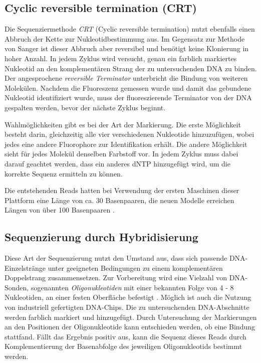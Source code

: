 \subsection{Cyclic reversible termination (CRT)}
\label{sec:bio:seq:crt}

Die Sequenziermethode \emph{CRT} (Cyclic reversible termination) nutzt ebenfalls einen Abbruch der Kette zur Nukleotidbestimmung aus. Im Gegensatz zur Methode von Sanger ist dieser Abbruch aber reversibel und benötigt keine Klonierung in hoher Anzahl. In jedem Zyklus wird versucht, genau ein farblich markiertes Nukleotid an den komplementären Strang der zu untersuchenden DNA zu binden. Der angesprochene \textit{reversible Terminator} unterbricht die Bindung von weiteren Molekülen. Nachdem die Fluoreszenz gemessen wurde und damit das gebundene Nukleotid identifiziert wurde, muss der fluoreszierende Terminator von der DNA gespalten werden, bevor der nächste Zyklus beginnt.

Wahlmöglichkeiten gibt es bei der Art der Markierung. Die erste Möglichkeit besteht darin, gleichzeitig alle vier verschiedenen Nukleotide hinzuzufügen, wobei jedes eine andere Fluorophore zur Identifikation erhält. Die andere Möglichkeit sieht für jedes Molekül denselben Farbstoff vor. In jedem Zyklus muss dabei darauf geachtet werden, dass ein anderes dNTP hinzugefügt wird, um die korrekte Sequenz ermitteln zu können. 

Die entstehenden Reads hatten bei Verwendung der ersten Maschinen dieser Plattform eine Länge von ca. 30 Basenpaaren, die neuen Modelle erreichen Längen von über 100 Basenpaaren \citep{Metzker2010}.
\subsection{Sequenzierung durch Hybridisierung}

Diese Art der Sequenzierung nutzt den Umstand aus, dass sich passende DNA-Einzelstränge unter geeigneten Bedingungen zu einem komplementären Doppelstrang zusammensetzen. Zur Vorbereitung wird eine Vielzahl von DNA-Sonden, sogenannten \textit{Oligonukleotiden} mit einer bekannten Folge von 4 - 8 Nukleotiden, an einer festen Oberfläche befestigt \citep{Gresham2008}. Möglich ist auch die Nutzung von industriell gefertigten DNA-Chips. Die zu untersuchenden DNA-Abschnitte werden farblich markiert und hinzugefügt. Durch Untersuchung der Markierungen an den Positionen der Oligonukleotide kann entschieden werden, ob eine Bindung stattfand. Fällt das Ergebnis positiv aus, kann die Sequenz dieses Reads durch Komplementierung der Basenabfolge des jeweiligen Oligonukleotids bestimmt werden.
